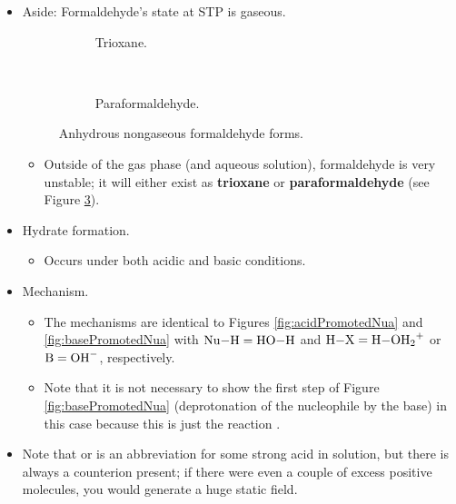 \documentclass[../notes.tex]{subfiles}
\begin{document}
\begin{itemize}
\begin{itemize}
\begin{itemize}
        \end{itemize}
    \end{itemize}
    \item Aside: Formaldehyde's state at STP is gaseous.
    \begin{figure}[h!]
        \centering
        \footnotesize
        \begin{subfigure}[b]{\linewidth}
            \centering
            \caption{Trioxane.}
            \label{fig:formaldehydeFormsa}
        \end{subfigure}\\
        \begin{subfigure}[b]{\linewidth}
            \centering
            \caption{Paraformaldehyde.}
            \label{fig:formaldehydeFormsb}
        \end{subfigure}
        \caption{Anhydrous nongaseous formaldehyde forms.}
        \label{fig:formaldehydeForms}
    \end{figure}
    \begin{itemize}
        \item Outside of the gas phase (and aqueous solution), formaldehyde is very unstable; it will either exist as \textbf{trioxane} or \textbf{paraformaldehyde} (see Figure \ref{fig:formaldehydeForms}).
    \end{itemize}
    \item Hydrate formation.
    \begin{itemize}
        \item Occurs under both acidic and basic conditions.
    \end{itemize}
    \item Mechanism.
    \begin{itemize}
        \item The mechanisms are identical to Figures \ref{fig:acidPromotedNua} and \ref{fig:basePromotedNua} with $\ce{Nu-H}=\ce{HO-H}$ and $\ce{H-X}=\ce{H-OH2+}$ or $\ce{B}=\ce{OH-}$, respectively.
        \item Note that it is not necessary to show the first step of Figure \ref{fig:basePromotedNua} (deprotonation of the nucleophile by the base) in this case because this is just the reaction .
    \end{itemize}
    \item Note that  or  is an abbreviation for some strong acid in solution, but there is always a counterion present; if there were even a couple of excess positive molecules, you would generate a huge static field.

\end{itemize}
\end{document}
